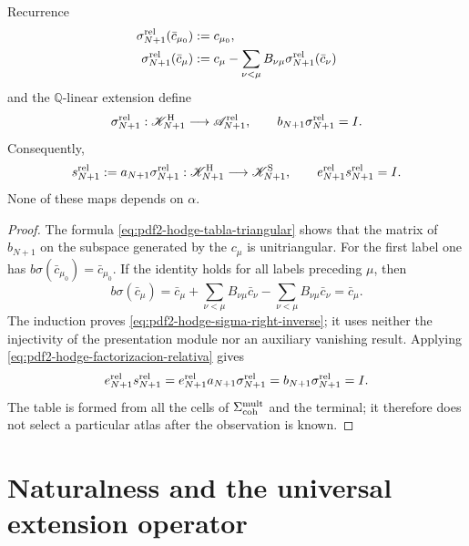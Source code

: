 \begin{proposition}
\label{prop:pdf2-hodge-seccion-relativa}
Recurrence
\begin{equation}\label{eq:pdf2-hodge-sigma-recursiva}
 \begin{aligned}
  \sigma_{N+1}^{\rm rel}(\bar c_{\mu_0})&:=c_{\mu_0},\\
  \sigma_{N+1}^{\rm rel}(\bar c_\mu)&:=
  c_\mu-\sum_{\nu<\mu}B_{\nu\mu}
             \sigma_{N+1}^{\rm rel}(\bar c_\nu)
 \end{aligned}
\end{equation}
and the $\mathbb Q$-linear extension define
\begin{equation}\label{eq:pdf2-hodge-sigma-right-inverse}
 \sigma_{N+1}^{\rm rel}:\mathscr K^{\rm H}_{N+1}\longrightarrow
 \mathscr A_{N+1}^{\rm rel},
 \qquad b_{N+1}\sigma_{N+1}^{\rm rel}=I.
\end{equation}
Consequently,
\begin{equation}\label{eq:pdf2-hodge-right-inverse}
 s_{N+1}^{\rm rel}:=a_{N+1}\sigma_{N+1}^{\rm rel}:
 \mathscr K^{\rm H}_{N+1}\longrightarrow\mathscr K^{\rm S}_{N+1},
 \qquad e_{N+1}^{\rm rel}s_{N+1}^{\rm rel}=I.
\end{equation}
None of these maps depends on $\alpha$.
\end{proposition}

\begin{proof}
The formula \eqref{eq:pdf2-hodge-tabla-triangular} shows that the
matrix of $b_{N+1}$ on the subspace generated by the $c_\mu$ is
unitriangular. For the first label one has
$b\sigma(\bar c_{\mu_0})=\bar c_{\mu_0}$. If the identity holds for all
labels preceding $\mu$, then
\[
 b\sigma(\bar c_\mu)
 =\bar c_\mu+\sum_{\nu<\mu}B_{\nu\mu}\bar c_\nu
  -\sum_{\nu<\mu}B_{\nu\mu}\bar c_\nu
 =\bar c_\mu.
\]
The induction proves \eqref{eq:pdf2-hodge-sigma-right-inverse}; it uses neither the
injectivity of the presentation module nor an auxiliary vanishing result. Applying
\eqref{eq:pdf2-hodge-factorizacion-relativa} gives
\[
 e_{N+1}^{\rm rel}s_{N+1}^{\rm rel}
 =e_{N+1}^{\rm rel}a_{N+1}\sigma_{N+1}^{\rm rel}
 =b_{N+1}\sigma_{N+1}^{\rm rel}=I.
\]
The table is formed from all the cells of
$\Sigma_{\rm coh}^{\rm mult}$ and the terminal; it therefore does not select a
particular atlas after the observation is known.
\end{proof}

\section{Naturalness and the universal extension operator}

